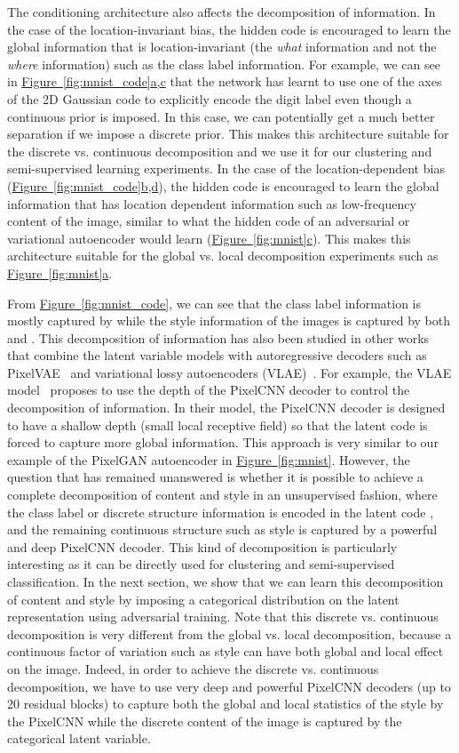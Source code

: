 \documentclass{article}
\newcommand{\myfig}[1]{\hyperref[fig:#1]{Figure~\ref*{fig:#1}}}
\newcommand{\myfigg}[2]{\hyperref[fig:#1]{Figure~\ref*{fig:#1}#2}}
\newcommand{\myfiggg}[3]{\hyperref[fig:#1]{Figure~\ref*{fig:#1}#2,#3}}
\begin{document}
The conditioning architecture also affects the decomposition of information. In the case of the location-invariant bias, the hidden code is encouraged to learn the global information that is location-invariant (the \emph{what} information and not the \emph{where} information) such as the class label information. For example, we can see in \myfiggg{mnist_code}{a}{c} that the network has learnt to use one of the axes of the 2D Gaussian code to explicitly encode the digit label even though a continuous prior is imposed. In this case, we can potentially get a much better separation if we impose a discrete prior. This makes this architecture suitable for the discrete vs. continuous decomposition and we use it for our clustering and semi-supervised learning experiments. In the case of the location-dependent bias (\myfiggg{mnist_code}{b}{d}), the hidden code is encouraged to learn the global information that has location dependent information such as low-frequency content of the image, similar to what the hidden code of an adversarial or variational autoencoder would learn (\myfigg{mnist}{c}). This makes this architecture suitable for the global vs. local decomposition experiments such as \myfigg{mnist}{a}.



From \myfig{mnist_code}, we can see that the class label information is mostly captured by  while the style information of the images is captured by both  and . 
This decomposition of information has also been studied in other works that combine the latent variable models with autoregressive decoders such as PixelVAE~\citep{pixelvae} and variational lossy autoencoders (VLAE)~\citep{vlae}. For example, the VLAE model~\citep{vlae} proposes to use the depth of the PixelCNN decoder to control the decomposition of information. In their model, the PixelCNN decoder is designed to have a shallow depth (small local receptive field) so that the latent code  is forced to capture more global information. This approach is very similar to our example of the PixelGAN autoencoder in \myfig{mnist}. However, the question that has remained unanswered is whether it is possible to achieve a complete decomposition of content and style in an unsupervised fashion, where the class label or discrete structure information is encoded in the latent code , and the remaining continuous structure such as style is captured by a powerful and deep PixelCNN decoder. This kind of decomposition is particularly interesting as it can be directly used for clustering and semi-supervised classification. In the next section, we show that we can learn this decomposition of content and style by imposing a categorical distribution on the latent representation  using adversarial training. 
Note that this discrete vs. continuous decomposition is very different from the global vs. local decomposition, because a continuous factor of variation such as style can have both global and local effect on the image. 
Indeed, in order to achieve the  discrete vs. continuous decomposition, we have to use very deep and powerful PixelCNN decoders (up to 20 residual blocks) to capture both the global and local statistics of the style by the PixelCNN while the discrete content of the image is captured by the categorical latent variable.
\end{document}
